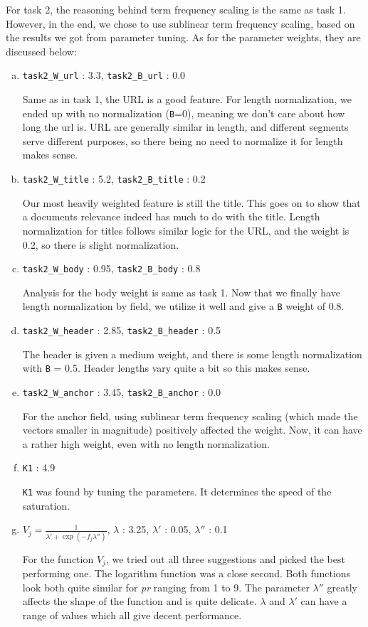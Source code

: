 \documentclass[10pt,twocolumn]{article}
\begin{document}
For task 2, the reasoning behind term frequency scaling is the same as task 1. However, in the end, we chose to use sublinear term frequency scaling, based on the results we got from parameter tuning. As for the parameter weights, they are discussed below:
\begin{enumerate}[(a)]
\item \texttt{task2\_W\_url} : 3.3, \texttt{task2\_B\_url} : 0.0

Same as in task 1, the URL is a good feature. For length normalization, we ended up with no normalization (\texttt{B}=0), meaning we don't care about how long the url is. URL are generally similar in length, and different segments serve different purposes, so there being no need to normalize it for length makes sense.
\item \texttt{task2\_W\_title} : 5.2, \texttt{task2\_B\_title} : 0.2

Our most heavily weighted feature is still the title. This goes on to show that a documents relevance indeed has much to do with the title. Length normalization for titles follows similar logic for the URL, and the weight is 0.2, so there is slight normalization.
\item \texttt{task2\_W\_body} : 0.95, \texttt{task2\_B\_body} : 0.8

Analysis for the body weight is same as task 1. Now that we finally have length normalization by field, we utilize it well and give a \texttt{B} weight of 0.8.
\item \texttt{task2\_W\_header} : 2.85, \texttt{task2\_B\_header} : 0.5

The header is given a medium weight, and there is some length normalization with \texttt{B} = 0.5. Header lengths vary quite a bit so this makes sense.
\item \texttt{task2\_W\_anchor} : 3.45, \texttt{task2\_B\_anchor} : 0.0

For the anchor field, using sublinear term frequency scaling (which made the vectors smaller in magnitude) positively affected the weight. Now, it can have a rather high weight, even with no length normalization.
\item \texttt{K1} : 4.9

\texttt{K1} was found by tuning the parameters. It determines the speed of the saturation.
\item $V_j = \frac{1}{\lambda'+\exp({-f_j\lambda''})}$, \texttt{$\lambda$} : 3.25, \texttt{$\lambda'$} : 0.05, \texttt{$\lambda''$} : 0.1

For the function $V_j$, we tried out all three suggestions and picked the best performing one. The logarithm function was a close second. Both functions look both quite similar for {\it pr} ranging from 1 to 9. The parameter $\lambda''$ greatly affects the shape of the function and is quite delicate. $\lambda$ and $\lambda'$ can have a range of values which all give decent performance.
\end{enumerate}
\end{document}
